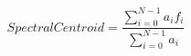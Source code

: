 \begin{equation}
\mathit{SpectralCentroid} = \frac{\displaystyle \sum_{i=0}^{N-1} a_i f_i}{\displaystyle \sum_{i=0}^{N-1} a_i} 
\label{eq:spectral_centroid}
\end{equation}
